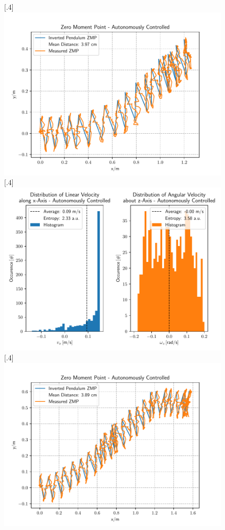 \begin{figure}[h]
	\centering
	[.4\linewidth]{\includegraphics[scale=.35]{chapters/05_experiments/02_autonomous_walking/straight_walk_01_zmp.pdf}}
	[.4\linewidth]{\includegraphics[scale=.35]{chapters/05_experiments/02_autonomous_walking/straight_walk_01_entropy.pdf}}
	[.4\linewidth]{\includegraphics[scale=.35]{chapters/05_experiments/02_autonomous_walking/curved_walk_01_zmp.pdf}}

\end{figure}
